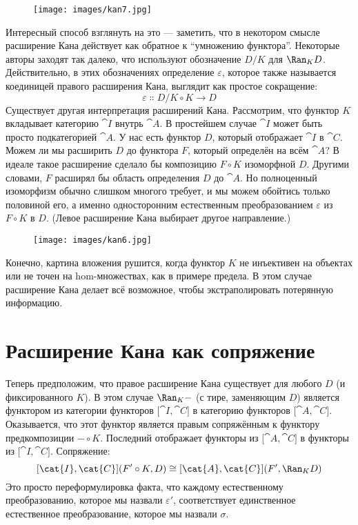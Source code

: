 \begin{figure}[H]
  \centering
  \texttt{[image: images/kan7.jpg]}
\end{figure}

\noindent
Интересный способ взглянуть на это — заметить, что в некотором смысле
расширение Кана действует как обратное к ``умножению функтора''. Некоторые
авторы заходят так далеко, что используют обозначение $D/K$ для $\Ran_{K}D$.
Действительно, в этих обозначениях определение $\varepsilon$, которое также
называется коединицей правого расширения Кана, выглядит как простое
сокращение:
\[\varepsilon \Colon D/K \circ K \to D\]
Существует другая интерпретация расширений Кана. Рассмотрим, что
функтор $K$ вкладывает категорию $\cat{I}$ внутрь $\cat{A}$. В
простейшем случае $\cat{I}$ может быть просто подкатегорией $\cat{A}$. У нас есть
функтор $D$, который отображает $\cat{I}$ в $\cat{C}$. Можем ли мы расширить
$D$ до функтора $F$, который определён на всём
$\cat{A}$? В идеале такое расширение сделало бы композицию
$F \circ K$ изоморфной $D$. Другими словами, $F$
расширял бы область определения $D$ до $\cat{A}$. Но
полноценный изоморфизм обычно слишком многого требует, и мы можем обойтись
только половиной его, а именно односторонним естественным преобразованием $\varepsilon$ из
$F \circ K$ в $D$. (Левое расширение Кана выбирает другое направление.)

\begin{figure}[H]
  \centering
  \texttt{[image: images/kan6.jpg]}
\end{figure}

\noindent
Конечно, картина вложения рушится, когда функтор $K$
не инъективен на объектах или не точен на hom-множествах, как в
примере предела. В этом случае расширение Кана делает всё возможное, чтобы
экстраполировать потерянную информацию.

\section{Расширение Кана как сопряжение}

Теперь предположим, что правое расширение Кана существует для любого $D$ (и
фиксированного $K$). В этом случае $\Ran_{K}-$ (с тире,
заменяющим $D$) является функтором из категории функторов
${[}\cat{I}, \cat{C}{]}$ в категорию функторов ${[}\cat{A}, \cat{C}{]}$. Оказывается,
что этот функтор является правым сопряжённым к функтору предкомпозиции
$- \circ K$. Последний отображает функторы из ${[}\cat{A}, \cat{C}{]}$
в функторы из ${[}\cat{I}, \cat{C}{]}$. Сопряжение:
\[[\cat{I}, \cat{C}](F' \circ K, D) \cong [\cat{A}, \cat{C}](F', \Ran_{K}D)\]
Это просто переформулировка факта, что каждому естественному
преобразованию, которое мы назвали $\varepsilon'$, соответствует единственное естественное
преобразование, которое мы назвали $\sigma$.

